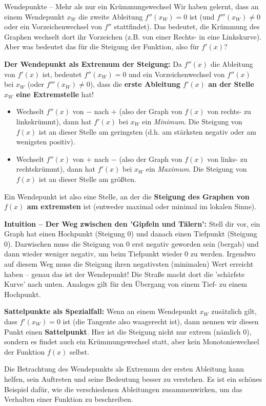 \begin{infoboxumgebung}{Wendepunkte – Mehr als nur ein Krümmungswechsel}
Wir haben gelernt, dass an einem Wendepunkt $x_W$ die zweite Ableitung $f''(x_W)=0$ ist (und $f'''(x_W) \neq 0$ oder ein Vorzeichenwechsel von $f''$ stattfindet). Das bedeutet, die Krümmung des Graphen wechselt dort ihr Vorzeichen (z.B. von einer Rechts- in eine Linkskurve). Aber was bedeutet das für die Steigung der Funktion, also für $f'(x)$?

\textbf{Der Wendepunkt als Extremum der Steigung:}
Da $f''(x)$ die Ableitung von $f'(x)$ ist, bedeutet $f''(x_W)=0$ und ein Vorzeichenwechsel von $f''(x)$ bei $x_W$ (oder $f'''(x_W) \neq 0$), dass die \textbf{erste Ableitung $f'(x)$ an der Stelle $x_W$ eine Extremstelle} hat!
\begin{itemize}
    \item Wechselt $f''(x)$ von $-$ nach $+$ (also der Graph von $f(x)$ von rechts- zu linkskrümmt), dann hat $f'(x)$ bei $x_W$ ein \textit{Minimum}. Die Steigung von $f(x)$ ist an dieser Stelle am geringsten (d.h. am stärksten negativ oder am wenigsten positiv).
    \item Wechselt $f''(x)$ von $+$ nach $-$ (also der Graph von $f(x)$ von links- zu rechtskrümmt), dann hat $f'(x)$ bei $x_W$ ein \textit{Maximum}. Die Steigung von $f(x)$ ist an dieser Stelle am größten.
\end{itemize}
Ein Wendepunkt ist also eine Stelle, an der die \textbf{Steigung des Graphen von $f(x)$ am extremsten} ist (entweder maximal oder minimal im lokalen Sinne).

\textbf{Intuition – Der Weg zwischen den 'Gipfeln und Tälern':}
Stell dir vor, ein Graph hat einen Hochpunkt (Steigung 0) und danach einen Tiefpunkt (Steigung 0). Dazwischen muss die Steigung von 0 erst negativ geworden sein (bergab) und dann wieder weniger negativ, um beim Tiefpunkt wieder 0 zu werden. Irgendwo auf diesem Weg muss die Steigung ihren negativsten (minimalen) Wert erreicht haben – genau das ist der Wendepunkt! Die Straße macht dort die 'schärfste Kurve' nach unten. Analoges gilt für den Übergang von einem Tief- zu einem Hochpunkt.

\textbf{Sattelpunkte als Spezialfall:}
Wenn an einem Wendepunkt $x_W$ zusätzlich gilt, dass $f'(x_W)=0$ ist (die Tangente also waagerecht ist), dann nennen wir diesen Punkt einen \textbf{Sattelpunkt}. Hier ist die Steigung nicht nur extrem (nämlich 0), sondern es findet auch ein Krümmungswechsel statt, aber kein Monotoniewechsel der Funktion $f(x)$ selbst.

Die Betrachtung des Wendepunkts als Extremum der ersten Ableitung kann helfen, sein Auftreten und seine Bedeutung besser zu verstehen. Es ist ein schönes Beispiel dafür, wie die verschiedenen Ableitungen zusammenwirken, um das Verhalten einer Funktion zu beschreiben.
\end{infoboxumgebung}
